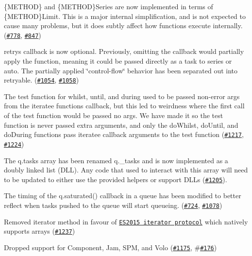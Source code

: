 \begin{DoxyItemize}
\item {\ttfamily \{M\+E\+T\+H\+OD\}} and {\ttfamily \{M\+E\+T\+H\+OD\}Series} are now implemented in terms of {\ttfamily \{M\+E\+T\+H\+OD\}Limit}. This is a major internal simplification, and is not expected to cause many problems, but it does subtly affect how functions execute internally. (\href{https://github.com/caolan/async/issues/778}{\tt \#778}, \href{https://github.com/caolan/async/issues/847}{\tt \#847})
\item {\ttfamily retry}\textquotesingle{}s callback is now optional. Previously, omitting the callback would partially apply the function, meaning it could be passed directly as a task to {\ttfamily series} or {\ttfamily auto}. The partially applied \char`\"{}control-\/flow\char`\"{} behavior has been separated out into {\ttfamily retryable}. (\href{https://github.com/caolan/async/issues/1054}{\tt \#1054}, \href{https://github.com/caolan/async/issues/1058}{\tt \#1058})
\item The test function for {\ttfamily whilst}, {\ttfamily until}, and {\ttfamily during} used to be passed non-\/error args from the iteratee function\textquotesingle{}s callback, but this led to weirdness where the first call of the test function would be passed no args. We have made it so the test function is never passed extra arguments, and only the {\ttfamily do\+Whilst}, {\ttfamily do\+Until}, and {\ttfamily do\+During} functions pass iteratee callback arguments to the test function (\href{https://github.com/caolan/async/issues/1217}{\tt \#1217}, \href{https://github.com/caolan/async/issues/1224}{\tt \#1224})
\item The {\ttfamily q.\+tasks} array has been renamed {\ttfamily q.\+\_\+tasks} and is now implemented as a doubly linked list (D\+LL). Any code that used to interact with this array will need to be updated to either use the provided helpers or support D\+L\+Ls (\href{https://github.com/caolan/async/issues/1205}{\tt \#1205}).
\item The timing of the {\ttfamily q.\+saturated()} callback in a {\ttfamily queue} has been modified to better reflect when tasks pushed to the queue will start queueing. (\href{https://github.com/caolan/async/issues/724}{\tt \#724}, \href{https://github.com/caolan/async/issues/1078}{\tt \#1078})
\item Removed {\ttfamily iterator} method in favour of \href{https://developer.mozilla.org/en-US/docs/Web/JavaScript/Guide/Iterators_and_Generators}{\tt E\+S2015 iterator protocol} which natively supports arrays (\href{https://github.com/caolan/async/issues/1237}{\tt \#1237})
\item Dropped support for Component, Jam, S\+PM, and Volo (\href{https://github.com/caolan/async/issues/1175}{\tt \#1175}, \#\href{https://github.com/caolan/async/issues/176}{\tt \#176})
\end{DoxyItemize}

